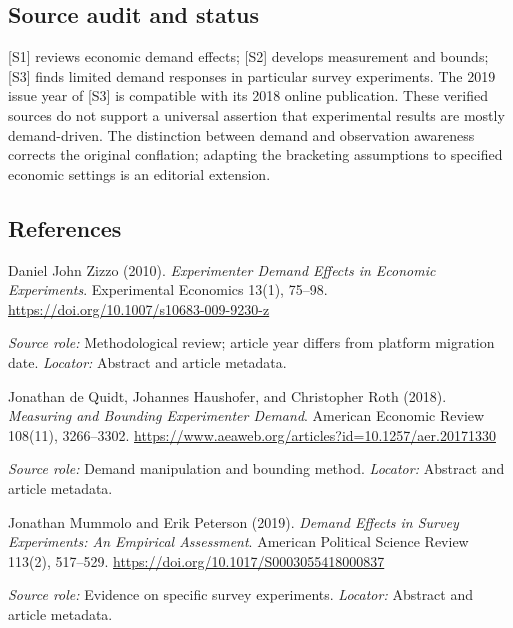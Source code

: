 \documentclass[11pt,a4paper]{article}
\begin{document}
\subsection*{Source audit and status}

[S1] reviews economic demand effects; [S2] develops measurement and bounds; [S3] finds limited demand responses in particular survey experiments. The 2019 issue year of [S3] is compatible with its 2018 online publication. These verified sources do not support a universal assertion that experimental results are mostly demand-driven. The distinction between demand and observation awareness corrects the original conflation; adapting the bracketing assumptions to specified economic settings is an editorial extension.

\subsection*{References}

\begin{enumerate}[label={[S\arabic*]},leftmargin=*]

\item Daniel John Zizzo (2010). \emph{Experimenter Demand Effects in Economic Experiments}. Experimental Economics 13(1), 75--98. \url{https://doi.org/10.1007/s10683-009-9230-z}\par \textit{Source role:} Methodological review; article year differs from platform migration date. \textit{Locator:} Abstract and article metadata.

\item Jonathan de Quidt, Johannes Haushofer, and Christopher Roth (2018). \emph{Measuring and Bounding Experimenter Demand}. American Economic Review 108(11), 3266--3302. \url{https://www.aeaweb.org/articles?id=10.1257/aer.20171330}\par \textit{Source role:} Demand manipulation and bounding method. \textit{Locator:} Abstract and article metadata.

\item Jonathan Mummolo and Erik Peterson (2019). \emph{Demand Effects in Survey Experiments: An Empirical Assessment}. American Political Science Review 113(2), 517--529. \url{https://doi.org/10.1017/S0003055418000837}\par \textit{Source role:} Evidence on specific survey experiments. \textit{Locator:} Abstract and article metadata.

\end{enumerate}
\end{document}
